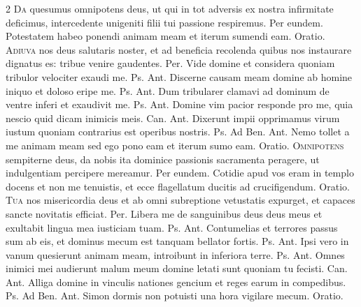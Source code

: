 \begin{multicols*}{2}
\lettrine[lines=2]{\zallmancaps \color{Blue} D}{a} quesumus omnipotens deus, ut qui in tot adversis ex nostra infirmitate deficimus, intercedente unigeniti filii tui passione respiremus. Per eundem.
 Potestatem habeo ponendi animam meam et iterum sumendi eam. {\color{Red} Oratio.}
\lettrine[lines=2]{\zallmancaps \color{Red} A}{diuva} nos deus salutaris noster, et ad beneficia recolenda quibus nos instaurare dignatus es: tribue venire gaudentes. Per.
 Vide domine et considera quoniam tribulor velociter exaudi me. {\color{Red} Ps.}  {\color{Red} Ant.} Discerne causam meam domine ab homine iniquo et doloso eripe me. {\color{Red} Ps.}  {\color{Red} Ant.} Dum tribularer clamavi ad dominum de ventre inferi et exaudivit me. {\color{Red} Ps.}  {\color{Red} Ant.} Domine vim pacior responde pro me, quia nescio quid dicam inimicis meis. {\color{Red} Can.}  {\color{Red} Ant.} Dixerunt impii opprimamus virum iustum quoniam contrarius est operibus nostris. {\color{Red} Ps.}  {\color{Red} Ad Ben. Ant.} Nemo tollet a me animam meam sed ego pono eam et iterum sumo eam. {\color{Red} Oratio.}
\lettrine[lines=2]{\zallmancaps \color{Blue} O}{mnipotens} sempiterne deus, da nobis ita dominice passionis sacramenta peragere, ut indulgentiam percipere mereamur. Per eundem.
 Cotidie apud vos eram in templo docens et non me tenuistis, et ecce flagellatum ducitis ad crucifigendum. {\color{Red} Oratio.}
\lettrine[lines=2]{\zallmancaps \color{Red} T}{ua} nos misericordia deus et ab omni subreptione vetustatis expurget, et capaces sancte novitatis efficiat. Per.
 Libera me de sanguinibus deus deus meus et exultabit lingua mea iusticiam tuam. {\color{Red} Ps.}  {\color{Red} Ant.} Contumelias et terrores passus sum ab eis, et dominus mecum est tanquam bellator fortis. {\color{Red} Ps.}  {\color{Red} Ant.} Ipsi vero in vanum quesierunt animam meam, introibunt in inferiora terre. {\color{Red} Ps.}  {\color{Red} Ant.} Omnes inimici mei audierunt malum meum domine letati sunt quoniam tu fecisti. {\color{Red} Can.}  {\color{Red} Ant.} Alliga domine in vinculis nationes gencium et reges earum in compedibus. {\color{Red} Ps.}  {\color{Red} Ad Ben. Ant.} Simon dormis non potuisti una hora vigilare mecum. {\color{Red} Oratio.}

\end{multicols*}
